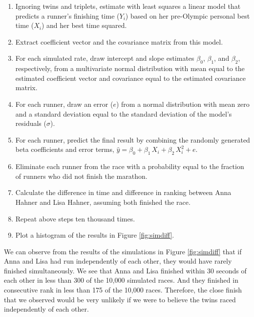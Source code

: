 \documentclass[12pt,titlepage]{article}
\begin{document}
\begin{enumerate}
\item Ignoring twins and triplets, estimate with least squares a
  linear model that predicts a runner's finishing time ($Y_i$) based
  on her pre-Olympic personal best time ($X_i$) and her best time
  squared.
\item Extract coefficient vector and the covariance matrix from this
  model.
\item For each simulated rate, draw intercept and slope estimates
  $\beta_0$, $\beta_1$, and $\beta_2$, respectively, from a
  multivariate normal distribution with mean equal to the estimated
  coefficient vector and covariance equal to the estimated covariance
  matrix.
\item For each runner, draw an error ($e$) from a normal distribution
  with mean zero and a standard deviation equal to the standard
  deviation of the model's residuals ($\sigma$).
\item For each runner, predict the final result by combining the randomly
  generated beta coefficients and error terms, $\hat{y} = \beta_0 +
  \beta_1\,X_i + \beta_2\,X_i^2 + e$.
\item Eliminate each runner from the race with a probability equal to
  the fraction of runners who did not finish the marathon.
\item Calculate the difference in time and difference in ranking
  between Anna Hahner and Lisa Hahner, assuming both finished the
  race.
\item Repeat above steps ten thousand times.
\item Plot a histogram of the results in Figure \ref{fig:simdiff}.
\end{enumerate}


We can observe from the results of the simulations in Figure \ref{fig:simdiff} that if Anna and Lisa had run independently of each other, they would have rarely finished simultaneously.  We see that Anna and Lisa finished within 30 seconds of each other in less than 300 of the 10,000 simulated races.  And they finished in consecutive rank in less than 175 of the 10,000 races.  Therefore, the close finish that we observed would be very unlikely if we were to believe the twins raced independently of each other.  
\end{document}
